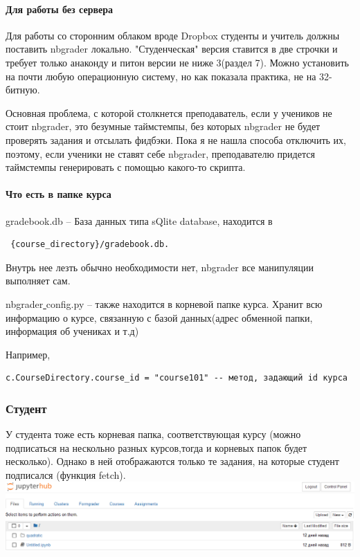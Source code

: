\documentclass[a4paper,12pt]{article}
\begin{document}
\paragraph{Для работы без сервера}
Для работы со сторонним облаком вроде Dropbox студенты и учитель должны поставить nbgrader локально. "Студенческая" версия ставится в две строчки и требует только анаконду и питон версии не ниже 3(раздел 7). Можно установить на почти любую операционную систему, но как показала практика, не на 32-битную.

 Основная проблема, с которой столкнется преподаватель, если у учеников не стоит nbgrader, это безумные таймстемпы, без которых nbgrader не будет проверять задания и отсылать фидбэки. Пока я не нашла способа отключить их, поэтому, если ученики не ставят себе nbgrader, преподавателю придется таймстемпы генерировать с помощью какого-то скрипта. 

\paragraph{Что есть в папке курса}

gradebook.db --  База данных типа sQlite database, находится в \begin{verbatim} {course_directory}/gradebook.db.\end{verbatim}
Внутрь нее лезть обычно необходимости нет, nbgrader все манипуляции выполняет сам. 

nbgrader\underline{ }config.py -- также находится в корневой папке курса. Хранит всю информацию о курсе, связанную с базой данных(адрес обменной папки, информация об учениках и т.д)

Например, 
\begin{verbatim}
c.CourseDirectory.course_id = "course101" -- метод, задающий id курса
\end{verbatim}

\subsubsection{Студент}
У студента тоже есть корневая папка, соответствующая курсу (можно подписаться на нескольно разных курсов,тогда и корневых папок будет несколько). Однако в ней отображаются только те задания, на которые студент подписался (функция fetch). 
\includegraphics[width=\textwidth]{student_root_directory}
\end{document}
